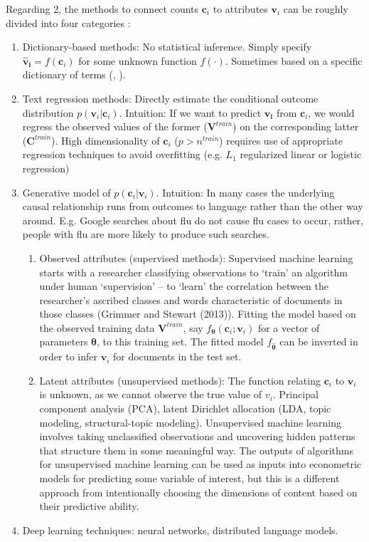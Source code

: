 \documentclass[12pt,a4paper,notitlepage]{article}
\begin{document}
Regarding 2, the methods to connect counts $\boldsymbol{c}_i$ to attributes $\boldsymbol{v}_i$ can be roughly divided into four categories \citep{gentzkow_text_2017}:
\begin{enumerate}
	\item Dictionary-based methods: 
	No statistical inference. Simply specify $\boldsymbol{\hat{v}_i}=f(\boldsymbol{c}_i)$ for some unknown function $f(\cdot)$. Sometimes based on a specific dictionary of terms (\citet{tetlock_giving_2007}, \citet{baker_measuring_2015}).
	\item Text regression methods:
	Directly estimate the conditional outcome distribution $p(\boldsymbol{v}_i|\boldsymbol{c}_i)$. Intuition: If we want to predict $\boldsymbol{v_i}$ from $\boldsymbol{c}_i$, we would regress the observed values of the former ($\boldsymbol{V}^{train}$) on the corresponding latter ($\boldsymbol{C}^{train}$). High dimensionality of $\boldsymbol{c}_i$ ($p > n^{train}$) requires use of appropriate regression techniques to avoid overfitting (e.g. $L_1$ regularized linear or logistic regression)
	\item Generative model of $p(\boldsymbol{c}_i|\boldsymbol{v}_i)$.
	Intuition: In many cases the underlying causal relationship runs from outcomes to language rather than the other way around. E.g. Google searches about flu do not cause flu cases to occur, rather, people with flu are more likely to produce such searches.
	\begin{enumerate}
		\item Observed attributes (supervised methods):
		Supervised machine learning starts with a researcher classifying observations to ‘train’ an algorithm under human ‘supervision’ – to ‘learn’ the correlation between the researcher’s ascribed classes and words characteristic of documents in those classes (Grimmer and Stewart (2013)). Fitting the model based on the observed training data $\boldsymbol{V}^{train}$, say $f_{\boldsymbol{\theta}}(\boldsymbol{c}_i;\boldsymbol{v}_i)$ for a vector of parameters $\boldsymbol{\theta}$, to this training set. The fitted model $f_{\hat{\boldsymbol{\theta}}}$ can be inverted in order to infer $\boldsymbol{v}_i$ for documents in the test set.
		\item Latent attributes (unsupervised methods): The function relating $\boldsymbol{c}_i$ to $\boldsymbol{v}_i$ is unknown, as we cannot observe the true value of $v_i$. Principal component analysis (PCA), latent Dirichlet allocation (LDA, topic modeling, structural-topic modeling). Unsupervised machine learning involves taking unclassified observations and uncovering hidden patterns that structure them in some meaningful way. The outputs of algorithms for unsupervised machine learning can be used as inputs into econometric models for predicting some variable of interest, but this is a different approach from intentionally choosing the dimensions of content based on their predictive ability.
	\end{enumerate}
	\item Deep learning techniques: neural networks, distributed language models.
\end{enumerate}
\end{document}
